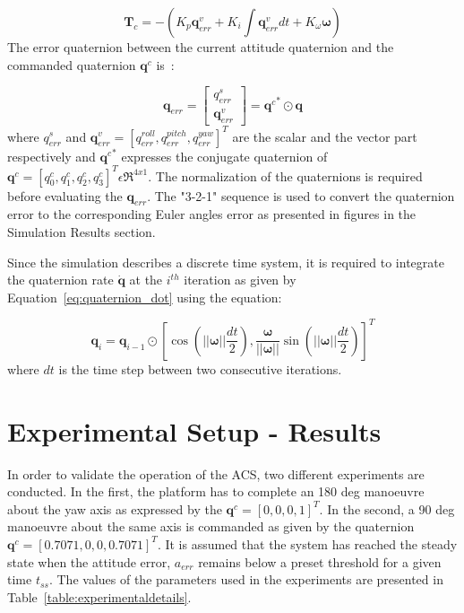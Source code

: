 \documentclass[aerospace,article,submit,moreauthors,dvi2pdf]{Definitions/mdpi}
\begin{document}
\begin{equation}
\textbf{T}_c=-(K_p\textbf{q}_{err}^v
+K_i\int\textbf{q}_{err}^vdt+K_{\omega}\boldsymbol{\omega})
\end{equation}
The error quaternion between the current attitude quaternion and the commanded quaternion $\textbf{q}^c$ is : 

\begin{equation}
\textbf{q}_{err}=
\begin{bmatrix}
q_{err}^s\\
\textbf{q}_{err}^v
\end{bmatrix}={\textbf{q}^{c}}^{*}\odot\textbf{q}
\end{equation}
where $q_{err}^s$ and $\textbf{q}_{err}^v=[q_{err}^{roll}, q_{err}^{pitch}, q_{err}^{yaw}]^T$ are the scalar and the vector part respectively and ${\textbf{q}^{c}}^{*}$ expresses the conjugate quaternion of $\textbf{q}^c=[q^{c}_0, q^{c}_1, q^{c}_2, q^{c}_3]^T\epsilon\Re^{4x1}$.
The normalization of the quaternions is required before evaluating the $\textbf{q}_{err}$. The "3-2-1" sequence is used to convert the quaternion error to the corresponding Euler angles error as presented in figures in the Simulation Results section.

Since the simulation describes a discrete time system, it is required to integrate the quaternion rate $\dot{\textbf{q}}$ at the $i^{th}$ iteration as given by Equation~\ref{eq:quaternion_dot} using the equation:

\begin{equation}
\textbf{q}_i=\textbf{q}_{i-1}\odot[\cos(||\boldsymbol{\omega}||\frac{dt}{2}), \frac{\boldsymbol{\omega}}{||\boldsymbol{\omega}||}\sin(||\boldsymbol{\omega}||\frac{dt}{2})]^T
\end{equation}
where $dt$ is the time step between two consecutive iterations.

\section{Experimental Setup - Results}
In order to validate the operation of the ACS, two different experiments are conducted. In the first, the platform has to complete an 180 deg manoeuvre about the yaw axis as expressed by the $\textbf{q}^c=[0, 0, 0, 1]^T$. In the second, a 90 deg manoeuvre about the same axis is commanded as given by the quaternion  $\textbf{q}^c=[0.7071, 0, 0, 0.7071]^T$. It is assumed that the system has reached the steady state when the attitude error, $a_{err}$ remains below a preset threshold for a given time $t_{ss}$. The values of the parameters used in the experiments are presented in Table~\ref{table:experimentaldetails}. 
\end{document}
